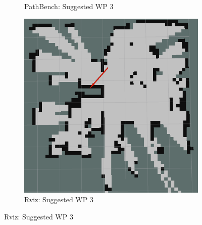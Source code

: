 \begin{figure}[htb]
\begin{subfigure}[b]{0.32\linewidth}
     \caption{PathBench: Suggested WP 3}
  \end{subfigure}
  \hfill
  \begin{subfigure}[b]{0.32\linewidth}
    \includegraphics[width=\linewidth]{images/real/sys/5_3.png}
     \caption{Rviz: Suggested WP 3}
  \end{subfigure}
  
  \newline
  

\end{figure}
